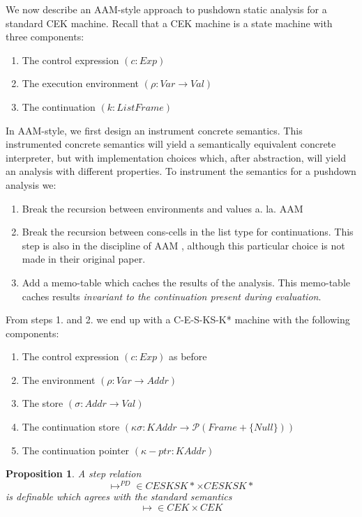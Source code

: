 \documentclass[10pt,letter,english]{article}
\newtheorem{proposition}[theorem]{Proposition}
\begin{document}
We now describe an AAM-style approach to pushdown static analysis for a standard CEK machine.
%
Recall that a CEK machine is a state machine with three components:
%
\begin{enumerate}
\item The control expression $(c : Exp)$
\item The execution environment $(\rho : Var \rightarrow Val)$
\item The continuation $(k : List Frame)$
\end{enumerate}
%
In AAM-style, we first design an instrument concrete semantics.
%
This instrumented concrete semantics will yield a semantically equivalent
concrete interpreter, but with implementation choices which, after abstraction,
will yield an analysis with different properties.
%
To instrument the semantics for a pushdown analysis we:
\begin{enumerate}
\item Break the recursion between environments and values a. la. AAM \cite{aam}
\item Break the recursion between cons-cells in the list type for continuations.
%
This step is also in the discipline of AAM \cite{aam}, although this particular
choice is not made in their original paper.
%
\item Add a memo-table which caches the results of the analysis.
%
This memo-table caches results \emph{invariant to the continuation present during evaluation}.
\end{enumerate}

From steps 1. and 2. we end up with a C-E-S-KS-K* machine with the following components:
\begin{enumerate}
\item The control expression $(c : Exp)$ as before
\item The environment $(\rho : Var \rightarrow Addr)$
\item The store $(\sigma : Addr \rightarrow Val)$
\item The continuation store $(\kappa\sigma : KAddr \rightarrow \mathcal{P}(Frame + \{Null\}))$
\item The continuation pointer $(\kappa-ptr : KAddr)$
\end{enumerate}

\begin{proposition}
A step relation
\begin{equation*}
\mapsto^{PD} \in CESKSK* \times CESKSK* 
\end{equation*}
is definable which agrees with the standard semantics
\begin{equation*}
\mapsto \in CEK \times CEK 
\end{equation*}
\end{proposition}
\end{document}

